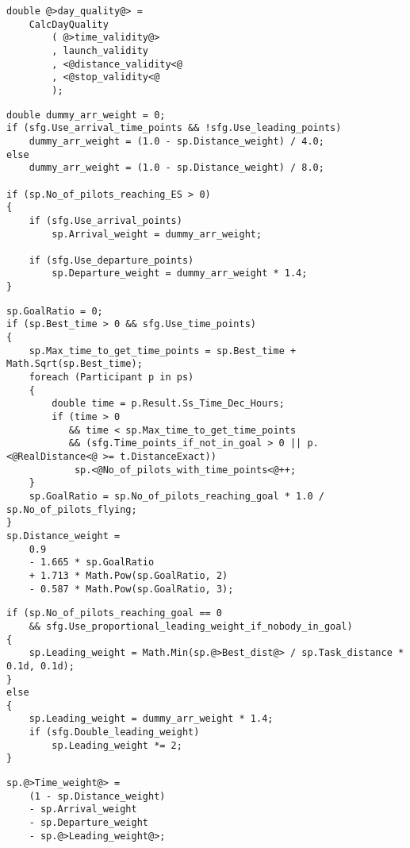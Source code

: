 \documentclass[gap.tex]{subfiles}
\begin{document}
\begin{lstlisting}[style=base, caption={Day quality depends on \textcolor{red}{bonus} distance.}]
double @>day_quality@> =
    CalcDayQuality
        ( @>time_validity@>
        , launch_validity
        , <@distance_validity<@
        , <@stop_validity<@
        );
\end{lstlisting}

\begin{lstlisting}[style=base, caption={Arrival weight and departure weight don't depend on distance inputs.}]
double dummy_arr_weight = 0;
if (sfg.Use_arrival_time_points && !sfg.Use_leading_points)
    dummy_arr_weight = (1.0 - sp.Distance_weight) / 4.0;
else
    dummy_arr_weight = (1.0 - sp.Distance_weight) / 8.0;

if (sp.No_of_pilots_reaching_ES > 0)
{
    if (sfg.Use_arrival_points)
        sp.Arrival_weight = dummy_arr_weight;

    if (sfg.Use_departure_points)
        sp.Departure_weight = dummy_arr_weight * 1.4;
}
\end{lstlisting}

\begin{lstlisting}[style=base, caption={Distance weight doesn't depend on distance inputs.}]
sp.GoalRatio = 0;
if (sp.Best_time > 0 && sfg.Use_time_points)
{
    sp.Max_time_to_get_time_points = sp.Best_time + Math.Sqrt(sp.Best_time);
    foreach (Participant p in ps)
    {
        double time = p.Result.Ss_Time_Dec_Hours;
        if (time > 0
           && time < sp.Max_time_to_get_time_points
           && (sfg.Time_points_if_not_in_goal > 0 || p.<@RealDistance<@ >= t.DistanceExact))
            sp.<@No_of_pilots_with_time_points<@++;
    }
    sp.GoalRatio = sp.No_of_pilots_reaching_goal * 1.0 / sp.No_of_pilots_flying;
}
sp.Distance_weight =
    0.9
    - 1.665 * sp.GoalRatio
    + 1.713 * Math.Pow(sp.GoalRatio, 2)
    - 0.587 * Math.Pow(sp.GoalRatio, 3);
\end{lstlisting}

\begin{lstlisting}[style=base, caption={Leading weight depends on \textcolor{red}{bonus} distance.}]
if (sp.No_of_pilots_reaching_goal == 0
    && sfg.Use_proportional_leading_weight_if_nobody_in_goal)
{
    sp.Leading_weight = Math.Min(sp.@>Best_dist@> / sp.Task_distance * 0.1d, 0.1d);
}
else
{
    sp.Leading_weight = dummy_arr_weight * 1.4;
    if (sfg.Double_leading_weight)
        sp.Leading_weight *= 2;
}
\end{lstlisting}

\begin{lstlisting}[style=base, caption={Time weight depends on \textcolor{red}{bonus} distance.}]
sp.@>Time_weight@> =
    (1 - sp.Distance_weight)
    - sp.Arrival_weight
    - sp.Departure_weight
    - sp.@>Leading_weight@>;
\end{lstlisting}
\end{document}
